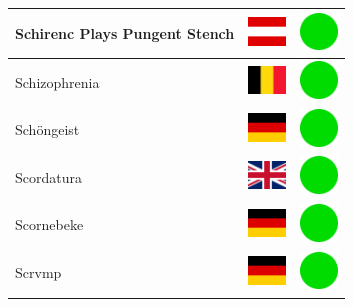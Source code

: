 \documentclass[12pt, a4paper, twoside]{report}
\begin{document}
\begin{center}
\begin{longtable}{|p{5cm}|p{2cm}|p{2cm}|}
 Schirenc Plays Pungent Stench                              & \includegraphics[width=1cm]{4x3/at} &   \includegraphics[width=1cm]{likes/y} \\ \hline
 Schizophrenia                                              & \includegraphics[width=1cm]{4x3/be} &   \includegraphics[width=1cm]{likes/y} \\ \hline
 Schöngeist                                                 & \includegraphics[width=1cm]{4x3/de} &   \includegraphics[width=1cm]{likes/y} \\ \hline
 Scordatura                                                 & \includegraphics[width=1cm]{4x3/gb} &   \includegraphics[width=1cm]{likes/y} \\ \hline
 Scornebeke                                                 & \includegraphics[width=1cm]{4x3/de} &   \includegraphics[width=1cm]{likes/y} \\ \hline
 Scrvmp                                                     & \includegraphics[width=1cm]{4x3/de} &   \includegraphics[width=1cm]{likes/y} \\ \hline

\end{longtable}
\end{center}
\end{document}

